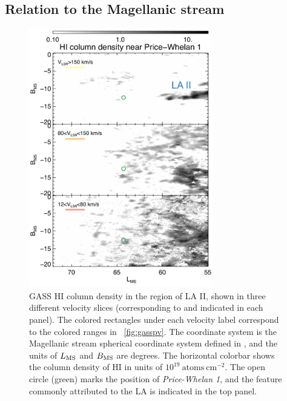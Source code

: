 \documentclass[twocolumn]{aastex62}
\newcommand{\hi}{H{\footnotesize I} }
\newcommand{\clustername}{\textsl{Price-Whelan 1}}
\begin{document}
\subsection{Relation to the Magellanic stream}
\label{sec:higas}

\begin{figure}[t]
\centering
\includegraphics[width=8cm]{figures/gass_maps_v3.pdf}
\caption{GASS \hi column density in the region of LA II, shown in three different velocity slices (corresponding to and indicated in each panel).
The colored rectangles under each velocity label correspond to the colored ranges in \figurename~\ref{fig:gasspv}.
The coordinate system is the Magellanic stream spherical coordinate system defined in \cite{Nidever:2008}, and the units of $L_{\rm MS}$ and $B_{\rm MS}$ are degrees.
The horizontal colorbar shows the column density of \hi in units of $10^{19}~\textrm{atoms}~\textrm{cm}^{-2}$.
The open circle (green) marks the position of \clustername, and the feature commonly attributed to the LA is indicated in the top panel.}
\label{fig:gass_maps}
\end{figure}
\end{document}
